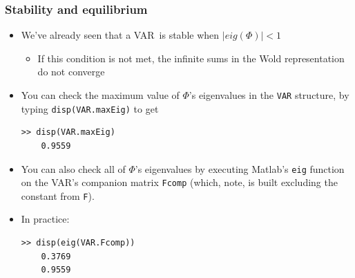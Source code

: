 \begin{xframe}
\frametitle{Stability and equilibrium}

\begin{itemize}
\item We've already seen that a VAR\ is stable when $\left\vert eig(\Phi
)\right\vert <1$\smallskip

\begin{itemize}
\item If this condition is not met, the infinite sums in the Wold
representation do not converge\bigskip
\end{itemize}

\pause

\item You can check the maximum value of $\Phi $'s eigenvalues in the %
\colorbox{script!80}{\small\texttt{VAR}} structure, by typing %
\colorbox{script!80}{\small\texttt{disp(VAR.maxEig)}} to get \medskip

\begin{minipage}{0.7\textwidth}
\small\begin{verbatim}
>> disp(VAR.maxEig)
    0.9559
\end{verbatim}
\end{minipage}\pause\medskip

\item You can also check all of $\Phi $'s eigenvalues by executing Matlab's %
\colorbox{script!80}{\small\texttt{eig}} function on the VAR's companion
matrix \colorbox{script!80}{\small\texttt{Fcomp}} (which, note, is built
excluding the constant from \colorbox{script!80}{\small\texttt{F}}).\bigskip

\item In practice:\medskip

\begin{minipage}{0.7\textwidth}
\small\begin{verbatim}
>> disp(eig(VAR.Fcomp))
    0.3769
    0.9559
\end{verbatim}
\end{minipage}
\end{itemize}
\end{xframe}


